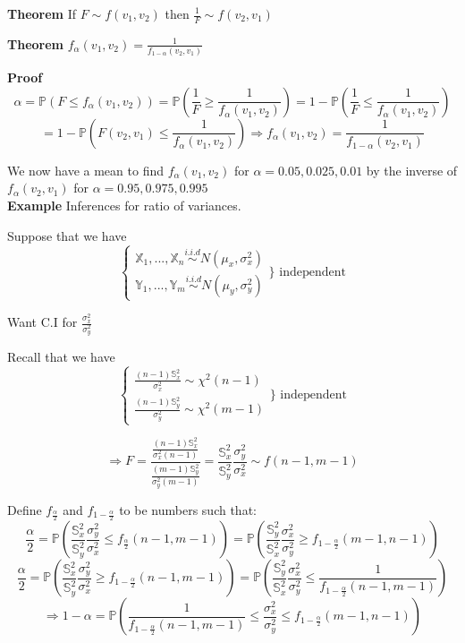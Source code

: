 \textbf{Theorem} If $F \sim f(v_1, v_2)$ then $\frac{1}{F} \sim f(v_2, v_1)$

\textbf{Theorem} $f_\alpha(v_1, v_2) = \frac{1}{f_{1-\alpha}(v_2, v_1)}$

\textbf{Proof} 
$$\alpha = \mathbb{P}(F \leq f_\alpha(v_1, v_2)) = \mathbb{P}(\frac{1}{F} \geq \frac{1}{ f_\alpha(v_1, v_2)})
= 1- \mathbb{P}(\frac{1}{F} \leq \frac{1}{ f_\alpha(v_1, v_2)}) $$
$$= 1- \mathbb{P}(F(v_2, v_1) \leq \frac{1}{ f_\alpha(v_1, v_2)}) \Rightarrow f_\alpha(v_1, v_2) = \frac{1}{f_{1-\alpha}(v_2, v_1)}$$

We now have a mean to find $f_\alpha(v_1, v_2)$ for $\alpha = 0.05, 0.025, 0.01$ by the inverse of $f_\alpha(v_2, v_1)$ for $\alpha = 0.95, 0.975, 0.995$\\

\textbf{Example} Inferences for ratio of variances.

Suppose that we have
$$\begin{cases}
\mathbb{X}_1, ..., \mathbb{X}_n \overset{i.i.d}{\sim} N(\mu_x, \sigma_x^2) \\
\mathbb{Y}_1, ..., \mathbb{Y}_m \overset{i.i.d}{\sim} N(\mu_y, \sigma_y^2) 
\end{cases} \Big\} \text{ independent}$$

Want C.I for $\frac{\sigma_x^2}{\sigma_y^2}$

Recall that we have
$$\begin{cases}
\frac{(n-1)\mathbb{S}_x^2}{\sigma_x^2} \sim \chi^2(n-1) \\
\frac{(n-1)\mathbb{S}_y^2}{\sigma_y^2} \sim \chi^2(m-1)
\end{cases} \Big\} \text{ independent}$$

$$\Rightarrow F = \frac{\frac{(n-1)\mathbb{S}_x^2}{\sigma_x^2(n-1)}}{\frac{(m-1)\mathbb{S}_y^2}{\sigma_y^2(m-1)}} = \frac{\mathbb{S}_x^2}{\mathbb{S}_y^2} \frac{\sigma_y^2}{\sigma_x^2} \sim f(n-1, m-1)$$

Define $f_{\frac{\alpha}{2}}$ and $f_{1-\frac{\alpha}{2}}$ to be numbers such that:
$$\frac{\alpha}{2} = \mathbb{P}(\frac{\mathbb{S}_x^2}{\mathbb{S}_y^2} \frac{\sigma_y^2}{\sigma_x^2} \leq f_{\frac{\alpha}{2}}(n-1, m-1))
= \mathbb{P}(\frac{\mathbb{S}_y^2}{\mathbb{S}_x^2} \frac{\sigma_x^2}{\sigma_y^2} \geq f_{1-\frac{\alpha}{2}}(m-1, n-1))$$
$$\frac{\alpha}{2} = \mathbb{P}(\frac{\mathbb{S}_x^2}{\mathbb{S}_y^2} \frac{\sigma_y^2}{\sigma_x^2} \geq f_{1-\frac{\alpha}{2}}(n-1, m-1))
= \mathbb{P}(\frac{\mathbb{S}_y^2}{\mathbb{S}_x^2} \frac{\sigma_x^2}{\sigma_y^2} \leq \frac{1}{f_{1-\frac{\alpha}{2}}(n-1, m-1)})$$
$$\Rightarrow 1-\alpha = \mathbb{P} (\frac{1}{f_{1-\frac{\alpha}{2}}(n-1, m-1)} \leq \frac{\sigma_x^2}{\sigma_y^2} \leq f_{1-\frac{\alpha}{2}}(m-1, n-1))$$

